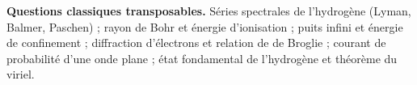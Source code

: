 \documentclass[11pt,a4paper]{article}
\begin{document}
\textbf{Questions classiques transposables.} Séries spectrales de l'hydrogène (Lyman, Balmer, Paschen) ; rayon de Bohr et énergie d'ionisation ; puits infini et énergie de confinement ; diffraction d'électrons et relation de de Broglie ; courant de probabilité d'une onde plane ; état fondamental de l'hydrogène et théorème du viriel.
\end{document}
